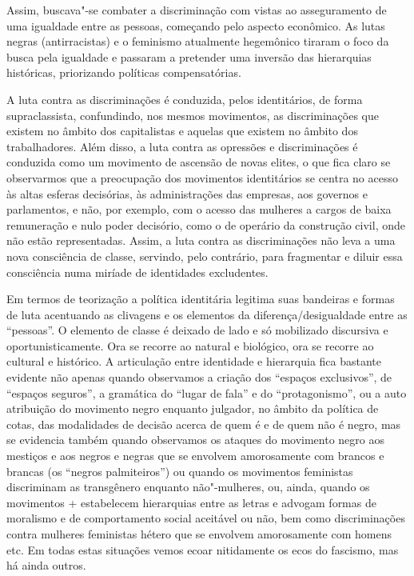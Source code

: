 Assim, buscava"-se combater a discriminação com vistas ao asseguramento
de uma igualdade entre as pessoas, começando pelo aspecto econômico. As
lutas negras (antirracistas) e o feminismo atualmente hegemônico tiraram
o foco da busca pela igualdade e passaram a pretender uma inversão das
hierarquias históricas, priorizando políticas compensatórias.

A luta contra as discriminações é conduzida, pelos identitários, de
forma supraclassista, confundindo, nos mesmos movimentos, as
discriminações que existem no âmbito dos capitalistas e aquelas que
existem no âmbito dos trabalhadores. Além disso, a luta contra as
opressões e discriminações é conduzida como um movimento de ascensão de
novas elites, o que fica claro se observarmos que a preocupação dos
movimentos identitários se centra no acesso às altas esferas decisórias,
às administrações das empresas, aos governos e parlamentos, e não, por
exemplo, com o acesso das mulheres a cargos de baixa remuneração e nulo
poder decisório, como o de operário da construção civil, onde não estão
representadas. Assim, a luta contra as discriminações não leva a uma
nova consciência de classe, servindo, pelo contrário, para fragmentar e
diluir essa consciência numa miríade de identidades excludentes.

Em termos de teorização a política identitária legitima suas bandeiras e
formas de luta acentuando as clivagens e os elementos da
diferença/desigualdade entre as ``pessoas''. O elemento de classe é
deixado de lado e só mobilizado discursiva e oportunisticamente. Ora se
recorre ao natural e biológico, ora se recorre ao cultural e histórico.
A articulação entre identidade e hierarquia fica bastante evidente não
apenas quando observamos a criação dos ``espaços exclusivos'', de
``espaços seguros'', a gramática do ``lugar de fala'' e do
``protagonismo'', ou a auto atribuição do movimento negro enquanto
julgador, no âmbito da política de cotas, das modalidades de decisão
acerca de quem é e de quem não é negro, mas se evidencia também quando
observamos os ataques do movimento negro aos mestiços e aos negros e
negras que se envolvem amorosamente com brancos e brancas (os ``negros
palmiteiros'') ou quando os movimentos feministas discriminam as
transgênero enquanto não"-mulheres, ou, ainda, quando os movimentos
+ estabelecem hierarquias entre as letras e advogam formas de
moralismo e de comportamento social aceitável ou não, bem como
discriminações contra mulheres feministas hétero que se envolvem
amorosamente com homens etc. Em todas estas situações vemos ecoar
nitidamente os ecos do fascismo, mas há ainda outros.

